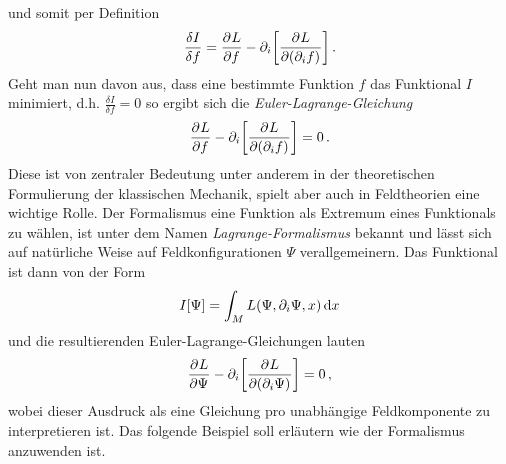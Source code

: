und somit per Definition 
\begin{equation}
\frac{\delta I}{\delta f}=\dpd{L}{ f}
-\partial_i\left[\dpd{L}{(\partial_i f)}\right]\,.
\end{equation}
Geht man nun davon aus, dass eine bestimmte Funktion $f$ das Funktional
$I$ minimiert, d.h. $\frac{\delta I}{\delta f}=0$ so ergibt sich die
\emph{Euler-Lagrange-Gleichung}
\begin{equation}
\dpd{L}{f}
-\partial_i\left[\dpd{L}{(\partial_i f)}\right]=0\,.
\end{equation}
Diese ist von zentraler Bedeutung unter anderem in der theoretischen
Formulierung der klassischen Mechanik, spielt aber auch in Feldtheorien eine
wichtige Rolle.
Der Formalismus eine Funktion als Extremum eines Funktionals zu wählen,
ist unter dem Namen \emph{Lagrange-Formalismus} bekannt und lässt sich auf
natürliche Weise auf Feldkonfigurationen $\Psi$ verallgemeinern. Das Funktional ist dann von der Form
\begin{equation}
I[\Psi]=\int_M L\left(\Psi,\partial_i \Psi,x\right)\dif x
\end{equation}
und die resultierenden Euler-Lagrange-Gleichungen lauten
\begin{equation}
\dpd{L}{\Psi}
-\partial_i\left[\dpd{L}{(\partial_i\Psi)}\right]=0\,,
\end{equation}
wobei dieser Ausdruck als eine Gleichung pro
unabhängige Feldkomponente zu interpretieren ist. Das folgende Beispiel soll
erläutern wie der Formalismus anzuwenden ist.
